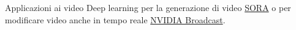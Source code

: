 \documentclass[aspectratio=169]{beamer}
\begin{document}
\begin{frame}{Applicazioni ai video}
    Deep learning per la generazione di video \href{https://openai.com/index/sora/}{SORA} o per modificare video anche in tempo reale \href{https://www.nvidia.com/it-it/geforce/broadcasting/broadcast-app/}{NVIDIA Broadcast}.
    \vspace{-0.6cm}
    \begin{columns}[T] %
        \begin{column}{.33\textwidth}
            \begin{center}
            \end{center}
        \end{column}%
        \begin{column}{.33\textwidth}
            \begin{center}
            \end{center}
        \end{column}%
        \begin{column}{.33\textwidth}

\end{column}
\end{columns}
\end{frame}
\end{document}
